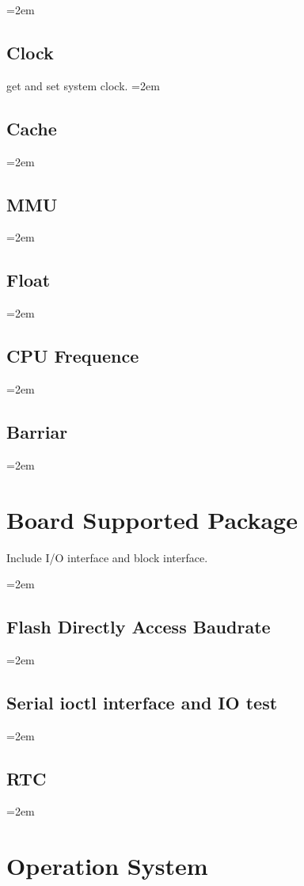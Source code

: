 \documentclass[a4paper]{article}
\let\oldsection\section
\renewcommand{\section}{\leftskip=2em \oldsection}
\let\oldsubsection\subsection
\renewcommand{\subsection}{\leftskip=2em \oldsubsection}
\begin{document}
\subsection{Clock}
get and set system clock.
\subsection{Cache}


\subsection{MMU}


\subsection{Float}


\subsection{CPU Frequence}


\subsection{Barriar}



\newpage
\section{Board Supported Package}

Include I/O interface and block interface.

\subsection{Flash Directly Access Baudrate}


\subsection{Serial ioctl interface and IO test}


\subsection{RTC}

\newpage
\section{Operation System}
\end{document}
